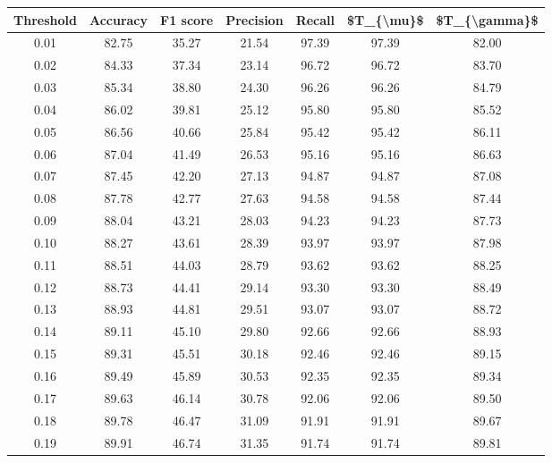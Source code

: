 \begin{tabular}{|c|c|c|c|c|c|c|}
\hline
 Threshold &  Accuracy &  F1 score &  Precision &  Recall &  \$T\_\{\textbackslash mu\}\$ &  \$T\_\{\textbackslash gamma\}\$ \\
\hline
      0.01 &     82.75 &     35.27 &      21.54 &   97.39 &      97.39 &         82.00 \\
      0.02 &     84.33 &     37.34 &      23.14 &   96.72 &      96.72 &         83.70 \\
      0.03 &     85.34 &     38.80 &      24.30 &   96.26 &      96.26 &         84.79 \\
      0.04 &     86.02 &     39.81 &      25.12 &   95.80 &      95.80 &         85.52 \\
      0.05 &     86.56 &     40.66 &      25.84 &   95.42 &      95.42 &         86.11 \\
      0.06 &     87.04 &     41.49 &      26.53 &   95.16 &      95.16 &         86.63 \\
      0.07 &     87.45 &     42.20 &      27.13 &   94.87 &      94.87 &         87.08 \\
      0.08 &     87.78 &     42.77 &      27.63 &   94.58 &      94.58 &         87.44 \\
      0.09 &     88.04 &     43.21 &      28.03 &   94.23 &      94.23 &         87.73 \\
      0.10 &     88.27 &     43.61 &      28.39 &   93.97 &      93.97 &         87.98 \\
      0.11 &     88.51 &     44.03 &      28.79 &   93.62 &      93.62 &         88.25 \\
      0.12 &     88.73 &     44.41 &      29.14 &   93.30 &      93.30 &         88.49 \\
      0.13 &     88.93 &     44.81 &      29.51 &   93.07 &      93.07 &         88.72 \\
      0.14 &     89.11 &     45.10 &      29.80 &   92.66 &      92.66 &         88.93 \\
      0.15 &     89.31 &     45.51 &      30.18 &   92.46 &      92.46 &         89.15 \\
      0.16 &     89.49 &     45.89 &      30.53 &   92.35 &      92.35 &         89.34 \\
      0.17 &     89.63 &     46.14 &      30.78 &   92.06 &      92.06 &         89.50 \\
      0.18 &     89.78 &     46.47 &      31.09 &   91.91 &      91.91 &         89.67 \\
      0.19 &     89.91 &     46.74 &      31.35 &   91.74 &      91.74 &         89.81 \\

\end{tabular}

